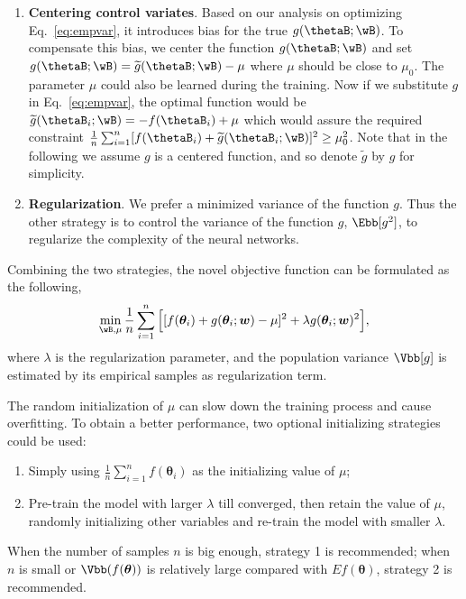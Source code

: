 \documentclass[runningheads]{llncs}
\begin{document}
\begin{enumerate}
    \item {\bf Centering control variates}. Based on our analysis on optimizing Eq.~\eqref{eq:empvar}, it introduces bias for the true $g(\thetaB; \wB)$. To compensate this bias, we center the function $g(\thetaB; \wB)$ and set $g(\thetaB; \wB)= \widetilde{g}(\thetaB; \wB) - \mu$ where $\mu$ should be close to $\mu_0$. The parameter $\mu$ could also be learned during the training. Now if we substitute $g$ in Eq.~\eqref{eq:empvar}, the optimal function would be $\widetilde{g}(\thetaB_i;\wB) = - f(\thetaB_i)+\mu$ which would assure the required constraint $\frac{1}{n}\sum_{i=1}^n [f(\thetaB_i) + \widetilde{g}(\thetaB_i; \wB)]^2\geq\mu_0^2$. Note that in the following we assume $g$ is a centered function, and so denote $\widetilde{g}$ by $g$ for simplicity.
    \item {\bf Regularization}. We prefer a minimized variance of the function $g$. Thus the other strategy is to control the variance of the function $g$, $\Ebb[g^2]$, to regularize the complexity of the neural networks.    
\end{enumerate}
Combining the two strategies, the novel objective function can be formulated as the following,
\begin{equation}
\min_{\wB, {\mu}} \frac{1}{n}\sum_{i=1}^n \Big[ [f(\bm{\theta}_i) + g(\bm{\theta}_i; \bm{w}) - \mu]^2 + \lambda  g(\bm{\theta}_i ; \bm{w})^2 \Big], 
\label{eq:regncv}
\end{equation}
where $\lambda$ is the regularization parameter, and the  population variance $\Vbb[g]$ is estimated by its empirical samples as regularization term.

The random initialization of $\mu$ can slow down the training process and cause overfitting. To obtain a better performance, two optional initializing strategies could be used:
\begin{enumerate}
    \item Simply using $\frac{1}{n}\sum_{i=1}^{n}f(\bm{\theta}_i )$ as the initializing value of $\mu$;
    \item Pre-train the model with larger $\lambda$ till converged, then retain the value of $\mu$, randomly initializing other variables and re-train the model with smaller $\lambda$.
\end{enumerate}
When the number of samples $n$ is big enough, strategy 1 is recommended; when $n$ is small or $\Vbb(f(\bm{\theta}))$ is relatively large compared with $Ef(\bm{\theta})$, strategy 2 is recommended.
\end{document}
